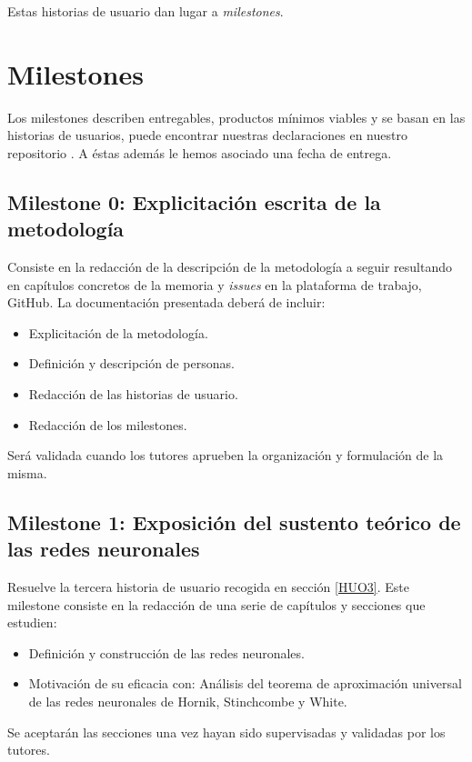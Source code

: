 
Estas historias de usuario dan lugar a \textit{milestones}. 

\section{Milestones}  

Los milestones describen entregables, productos mínimos viables y se basan en las historias de usuarios,
puede encontrar nuestras declaraciones en nuestro repositorio \cite{TFG-Estudio-de-las-redes-neuronales-milestones}. 
A éstas además le hemos asociado una fecha de entrega. 


\subsection*{Milestone 0: Explicitación escrita de la metodología} 
Consiste en la redacción de la descripción de la metodología a seguir resultando en capítulos concretos de la memoria 
y \textit{issues} en la plataforma de trabajo, GitHub.  
La documentación presentada deberá de incluir: 
\begin{itemize}
    \item Explicitación de la metodología. 
    \item Definición y descripción de personas.
    \item Redacción de las historias de usuario.
    \item Redacción de los milestones.
\end{itemize}
Será validada cuando los tutores aprueben la organización y formulación de la misma.


\subsection*{Milestone 1: Exposición del sustento teórico de las redes neuronales}  
Resuelve la tercera historia de usuario recogida en sección \ref{HUO3}.
Este milestone consiste en la redacción de una serie de capítulos y secciones 
que estudien: 
\begin{itemize}
    \item Definición y construcción de las redes neuronales.
    \item Motivación de su eficacia con: Análisis del 
    teorema de aproximación universal de las redes neuronales de Hornik, Stinchcombe y White.
\end{itemize}
Se aceptarán las secciones una vez hayan sido supervisadas y validadas por los tutores. 

